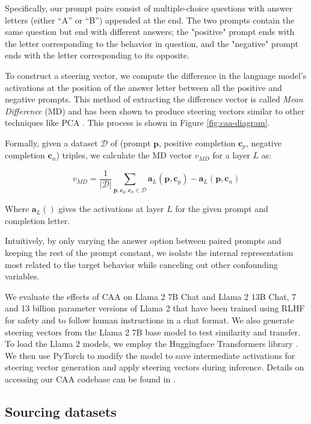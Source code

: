 \documentclass[11pt]{article}
\begin{document}
Specifically, our prompt pairs consist of multiple-choice questions with answer letters (either ``A'' or ``B'') appended at the end. The two prompts contain the same question but end with different answers; the "positive" prompt ends with the letter corresponding to the behavior in question, and the "negative" prompt ends with the letter corresponding to its opposite.

To construct a steering vector, we compute the difference in the language model's activations at the position of the answer letter between all the positive and negative prompts. This method of extracting the difference vector is called \textit{Mean Difference} (MD) and has been shown to produce steering vectors similar to other techniques like PCA \citep{tigges2023linear}. This process is shown in Figure \ref{fig:caa-diagram}.

Formally, given a dataset $\mathcal{D}$ of (prompt $\mathbf{p}$, positive completion $\mathbf{c}_p$, negative completion $\mathbf{c}_n$) triples, we calculate the MD vector $v_{MD}$ for a layer $L$ as:

\begin{equation}
v_{MD} = \frac{1}{|\mathcal{D}|}\sum_{\mathbf{p}, \mathbf{c}_p, \mathbf{c}_n \in \mathcal{D}}{\mathbf{a}_L(\mathbf{p}, \mathbf{c}_p) - \mathbf{a}_L(\mathbf{p}, \mathbf{c}_n)}
\end{equation}

Where $\mathbf{a}_L()$ gives the activations at layer $L$ for the given prompt and completion letter.

Intuitively, by only varying the answer option between paired prompts and keeping the rest of the prompt constant, we isolate the internal representation most related to the target behavior while canceling out other confounding variables. 

We evaluate the effects of CAA on Llama 2 7B Chat and Llama 2 13B Chat, 7 and 13 billion parameter versions of Llama 2 that have been trained using RLHF for safety and to follow human instructions in a chat format. We also generate steering vectors from the Llama 2 7B base model to test similarity and transfer. To load the Llama 2 models, we employ the Huggingface Transformers library \citep{huggingfacetransformers}. We then use  PyTorch \citep{pytorch} to modify the model to save intermediate activations for steering vector generation and apply steering vectors during inference. Details on accessing our CAA codebase can be found in .

\subsection{Sourcing datasets}
\end{document}
